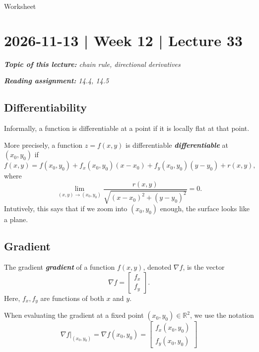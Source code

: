 \documentclass[10pt]{article}
\DeclareRobustCommand{\demph}[1]{%
  \ifmmode
  {\color{Blue}#1}%
  \else
  {\color{Blue}\bfseries\slshape #1}%
  \fi
}
\theoremstyle{definition}
\newcommand{\1}[1]{\textbf{1}_{\left[#1\right]}} %
\def\R{\mathbb{R}} %
\begin{document}
Worksheet


\newpage
\section{2026-11-13 | Week 12 | Lecture 33}
\begin{center}
  \begin{tcolorbox}[width=0.9\textwidth, colback=white, colframe=black]
    \textit{\textbf{Topic of this lecture:} chain rule, directional derivatives}

    \textit{\textbf{Reading assignment:} 14.4, 14.5}
  \end{tcolorbox}
\end{center}

\subsection{Differentiability}
Informally, a function is differentiable at a point if it is locally flat at
that point.

More precisely, a function $z=f(x,y)$ is \demph{differentiable} at
$(x_{0},y_{0})$ if
\begin{equation*}
  f(x,y)
  = f(x_0,y_0)
  + f_x(x_0,y_0)(x-x_0)
  + f_y(x_0,y_0)(y-y_0)
  + r(x,y),
\end{equation*}
where
\begin{equation*}
  \lim_{(x,y)\to(x_0,y_0)}
  \frac{r(x,y)}
  {\sqrt{(x-x_0)^2+(y-y_0)^2}}
  =0.
\end{equation*}
Intutively, this says that if we zoom into $(x_{0},y_{0})$ enough, the surface
looks like a plane.


\subsection{Gradient}


The \demph{gradient} of a function $f(x,y)$, denoted $\nabla f$, is the vector
\begin{equation*}
  \nabla f =
  \begin{bmatrix}
    f_{x}\\
    f_{y}
  \end{bmatrix}.
\end{equation*}
Here, $f_{x},f_{y}$ are functions of both $x$ and $y$.

When evaluating the gradient at a fixed point $(x_{0},y_{0})\in \R^{2}$, we
use the notation
\begin{equation*}
  \nabla f|_{(x_{0},y_{0})} = \nabla f(x_{0},y_{0})=
  \begin{bmatrix}
    f_{x}(x_{0},y_{0})\\
    f_{y}(x_{0},y_{0})
  \end{bmatrix}
\end{equation*}
\end{document}
